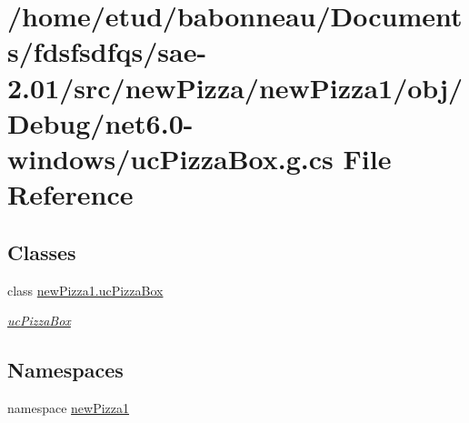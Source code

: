 \hypertarget{Debug_2net6_80-windows_2ucPizzaBox_8g_8cs}{}\section{/home/etud/babonneau/\+Documents/fdsfsdfqs/sae-\/2.01/src/new\+Pizza/new\+Pizza1/obj/\+Debug/net6.0-\/windows/uc\+Pizza\+Box.g.\+cs File Reference}
\label{Debug_2net6_80-windows_2ucPizzaBox_8g_8cs}
\subsection*{Classes}
\begin{DoxyCompactItemize}
\item 
class \hyperlink{classnewPizza1_1_1ucPizzaBox}{new\+Pizza1.\+uc\+Pizza\+Box}
\begin{DoxyCompactList}\small\item\em \hyperlink{classnewPizza1_1_1ucPizzaBox}{uc\+Pizza\+Box} \end{DoxyCompactList}\end{DoxyCompactItemize}
\subsection*{Namespaces}
\begin{DoxyCompactItemize}
\item 
namespace \hyperlink{namespacenewPizza1}{new\+Pizza1}
\end{DoxyCompactItemize}
